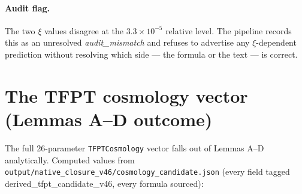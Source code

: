 \paragraph{Audit flag.} The two \(\xi\) values disagree at the
\(3.3\times 10^{-5}\) relative level. The pipeline records this as an
unresolved \emph{audit\_mismatch} and refuses to advertise any
\(\xi\)-dependent prediction without resolving which side --- the
formula or the text --- is correct.

\section{The TFPT cosmology vector (Lemmas A--D outcome)}
\label{sec:cosmovec}

The full 26-parameter \texttt{TFPTCosmology} vector falls out of Lemmas
A--D analytically.  Computed values from
\texttt{output/native\_closure\_v46/cosmology\_candidate.json} (every
field tagged \textsf{derived\_tfpt\_candidate\_v46}, every formula
sourced):


